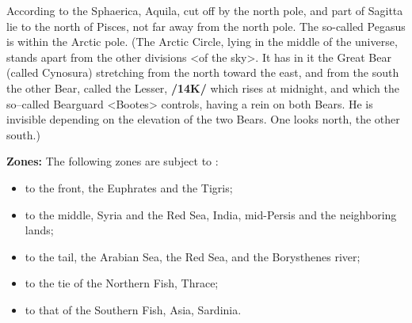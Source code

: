 According to the Sphaerica, Aquila, cut off by the north pole, and part of Sagitta lie to the north of Pisces, not far away from the north pole. The so-called Pegasus is within the Arctic pole. (The Arctic Circle, lying in the middle of the universe, stands apart from the other divisions <of the sky>. It has in it the Great Bear (called Cynosura) stretching from the north toward the east, and from the south the other Bear, called the Lesser, \textbf{/14K/} which rises at midnight, and which the so–called Bearguard <Bootes> controls, having a rein on both Bears. He is invisible depending on the elevation of the two Bears. One looks north, the other south.) 

\textbf{Zones:} The following zones are subject to \Pisces: 
\begin{itemize}
\item to the front, the Euphrates and the Tigris; 
\item to the middle, Syria and the Red Sea, India, mid-Persis and the neighboring lands; 
\item to the tail, the Arabian Sea, the Red Sea, and the Borysthenes river; 
\item to the tie of the Northern Fish, Thrace; 
\item to that of the Southern Fish, Asia, Sardinia.
\end{itemize}

\newpage